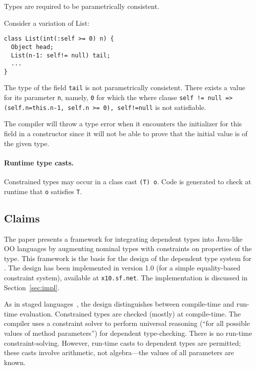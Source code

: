 Types are required to be parametrically consistent.

\begin{example} Consider  a variation of List:
{\footnotesize
\begin{verbatim}
class List(int(:self >= 0) n) {
  Object head;
  List(n-1: self!= null) tail;
  ...
}
\end{verbatim}}
The type of the field {\tt tail} is not parametrically
consistent. There exists a value for its parameter {\tt n}, namely,
{\tt 0} for which the where clause {\tt self != null =>
(self.n=this.n-1, self.n >= 0), self!=null} is not satisfiable.

The compiler will throw a type error when it encounters the
initializer for this field in a constructor since it will not be able
to prove that the initial value is of the given type.

\end{example}

\paragraph{Runtime type casts.} 
Constrained types may occur in a class cast {\tt (T) o}.  Code is
generated to check at runtime that {\tt o} satisfies {\tt T}.


\subsection{Claims}
The paper presents a framework for integrating dependent types into
Java-like OO languages by augmenting nominal types with constraints on
properties of the type. This framework is the basis for the design of
the dependent type system for \Xten{}. The design has been implemented
in \Xten{} version 1.0 (for a simple equality-based constraint
system), available at {\tt x10.sf.net}.  The implementation is
discussed in Section~\ref{sec:impl}.

As in staged languages~\cite{nielson-multistage,ts97-multistage}, the
design distinguishes between compile-time and run-time
evaluation. Constrained types are checked (mostly) at compile-time.
The compiler uses a constraint solver to perform universal reasoning
(``for all possible values of method parameters'') for dependent
type-checking.  There is no run-time constraint-solving.  However,
run-time casts to dependent types are permitted; these casts involve
arithmetic, not algebra---the values of all parameters are known.

